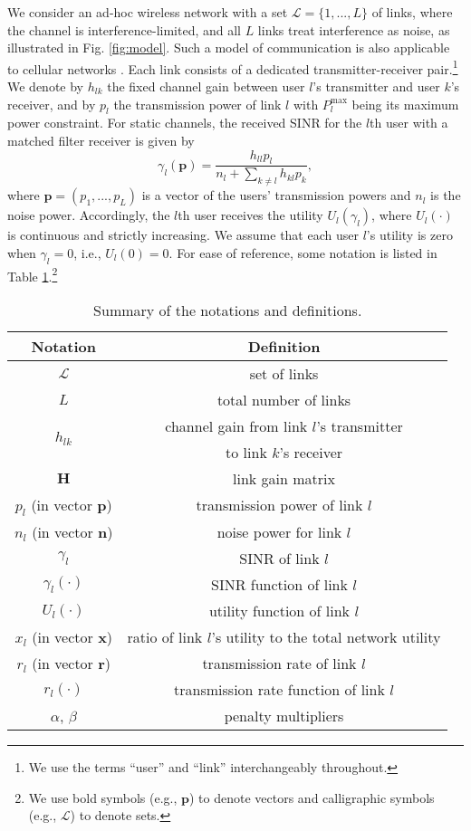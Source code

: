 \documentclass[10pt,journal,letterpaper,compsoc]{IEEEtran}
\begin{document}
We consider an ad-hoc wireless network with a set $\mathcal{L}=\{1,...,L\}$ of links, where the channel is interference-limited, and all $L$ links treat interference as noise, as illustrated in Fig. \ref{fig:model}. Such a model of communication is also applicable to cellular networks \cite{chiang:2008}. Each link consists of a dedicated transmitter-receiver pair.\footnote{We use the terms ``user'' and ``link'' interchangeably throughout.} We denote by $h_{lk}$ the fixed channel gain between user $l$'s transmitter and user $k$'s receiver, and by $p_l$ the transmission power of link $l$ with $P_l^{\max}$ being its maximum power constraint. For static channels, the received SINR for the $l$th user with a matched filter receiver is given by
\begin{equation}
\gamma_l(\mathbf{p})=\frac{h_{ll}p_l}{n_l+\sum_{k\ne l}{h_{kl}p_k}},
\end{equation}
where $\mathbf{p}=(p_1,...,p_L)$ is a vector of the users' transmission powers and $n_l$ is the noise power. Accordingly, the $l$th user receives the utility $U_l(\gamma_l)$, where $U_l(\cdot)$ is continuous and strictly increasing. We assume that each user $l$'s utility is zero when $\gamma_l=0$, i.e., $U_l(0)=0$. For ease of reference, some notation is listed in Table \ref{tab:notations}.\footnote{We use bold symbols (e.g., $\mathbf{p}$) to denote vectors and calligraphic symbols (e.g., $\mathcal{L}$) to denote sets.}



\begin{table}
\centering
\begin{tabular}{|c|c|}
\hline
\textbf{Notation} & \textbf{Definition}\\
\hline
$\mathcal{L}$ & set of links\\
\hline
$L$ & total number of links \\
\hline
\multirow{2}{*}{$h_{lk}$} & channel gain from link $l$'s transmitter\\
& to link $k$'s receiver\\
\hline
$\mathbf{H}$ & link gain matrix\\
\hline
$p_l$ (in vector $\mathbf{p}$) & transmission power of link $l$\\
\hline
$n_l$ (in vector $\mathbf{n}$) & noise power for link $l$\\
\hline
$\gamma_l$ & SINR of link $l$\\
\hline
$\gamma_l(\cdot)$ & SINR function of link $l$\\
\hline
$U_l(\cdot)$ & utility function of link $l$\\
\hline
$x_l$ (in vector $\mathbf{x}$) & ratio of link $l$'s utility to the total network utility\\
\hline
$r_l$ (in vector $\mathbf{r}$) & transmission rate of link $l$\\
\hline
$r_l(\cdot)$ & transmission rate function of link $l$\\
\hline
$\alpha$, $\beta$ & penalty multipliers\\
\hline
\end{tabular}
\caption{Summary of the notations and definitions.}\label{tab:notations}
\end{table}
\end{document}
